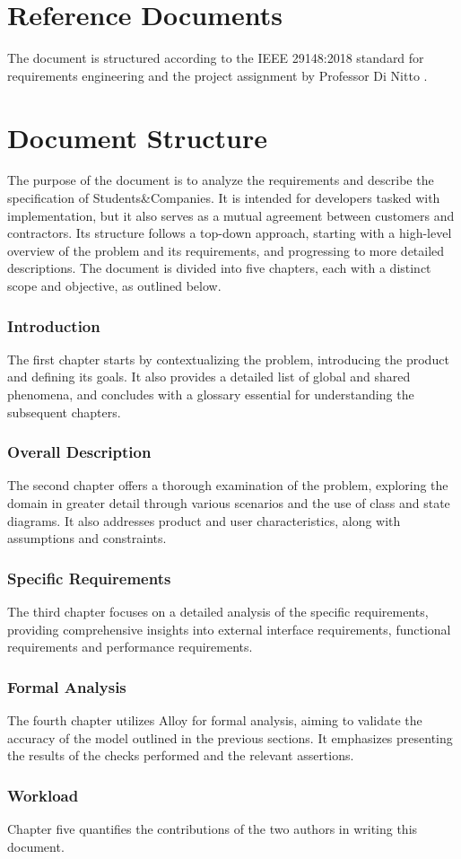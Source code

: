 \section{Reference Documents}
The document is structured according to the IEEE 29148:2018 standard for requirements engineering \cite{ieee2018} and the project assignment by Professor Di Nitto \cite{dinitto2024}.

\section{Document Structure}
The purpose of the document is to analyze the requirements and describe the specification of Students\&Companies.
It is intended for developers tasked with implementation, but it also serves as a mutual agreement between customers and contractors.
Its structure follows a top-down approach, starting with a high-level overview of the problem and its requirements, and progressing to more detailed descriptions.
The document is divided into five chapters, each with a distinct scope and objective, as outlined below.

\subsubsection{Introduction}
The first chapter starts by contextualizing the problem, introducing the product and defining its goals.
It also provides a detailed list of global and shared phenomena, and concludes with a glossary essential for understanding the subsequent chapters.

\subsubsection{Overall Description}
The second chapter offers a thorough examination of the problem, exploring the domain in greater detail through various scenarios and the use of class and state diagrams.
It also addresses product and user characteristics, along with assumptions and constraints.

\subsubsection{Specific Requirements}
The third chapter focuses on a detailed analysis of the specific requirements, providing comprehensive insights into external interface requirements, functional requirements and performance requirements.

\subsubsection{Formal Analysis}
The fourth chapter utilizes Alloy for formal analysis, aiming to validate the accuracy of the model outlined in the previous sections.
It emphasizes presenting the results of the checks performed and the relevant assertions.

\subsubsection{Workload}
Chapter five quantifies the contributions of the two authors in writing this document.
